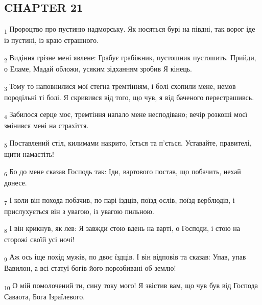 \subsection{CHAPTER 21}
\begin{tcolorbox}
\textsubscript{1} Пророцтво про пустиню надморську. Як носяться бурі на півдні, так ворог іде із пустині, із краю страшного.
\end{tcolorbox}
\begin{tcolorbox}
\textsubscript{2} Видіння грізне мені явлене: Грабує грабіжник, пустошник пустошить. Прийди, о Еламе, Мадай обложи, усяким зідханням зробив Я кінець.
\end{tcolorbox}
\begin{tcolorbox}
\textsubscript{3} Тому то наповнилися мої стегна тремтінням, і болі схопили мене, немов породільні ті болі. Я скривився від того, що чув, я від баченого перестрашивсь.
\end{tcolorbox}
\begin{tcolorbox}
\textsubscript{4} Забилося серце моє, тремтіння напало мене несподівано; вечір розкоші моєї змінився мені на страхіття.
\end{tcolorbox}
\begin{tcolorbox}
\textsubscript{5} Поставлений стіл, килимами накрито, їсться та п'ється. Уставайте, правителі, щити намастіть!
\end{tcolorbox}
\begin{tcolorbox}
\textsubscript{6} Бо до мене сказав Господь так: Іди, вартового постав, що побачить, нехай донесе.
\end{tcolorbox}
\begin{tcolorbox}
\textsubscript{7} І коли він похода побачив, по парі їздців, поїзд ослів, поїзд верблюдів, і прислухується він з увагою, із увагою пильною.
\end{tcolorbox}
\begin{tcolorbox}
\textsubscript{8} І він крикнув, як лев: Я завжди стою вдень на варті, о Господи, і стою на сторожі своїй усі ночі!
\end{tcolorbox}
\begin{tcolorbox}
\textsubscript{9} Аж ось іще похід мужів, по двоє їздців. І він відповів та сказав: Упав, упав Вавилон, а всі статуї богів його порозбивані об землю!
\end{tcolorbox}
\begin{tcolorbox}
\textsubscript{10} О мій помолочений ти, сину току мого! Я звістив вам, що чув був від Господа Саваота, Бога Ізраїлевого.
\end{tcolorbox}
